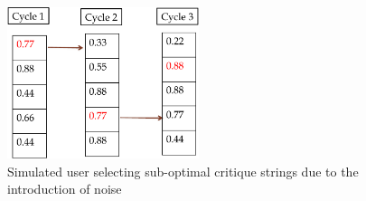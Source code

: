 \begin{figure}
  \centering
  \captionsetup{justification=centering}
    \includegraphics[width=0.5\textwidth]{figures-bharath/noisy.pdf}
  \caption{Simulated user selecting sub-optimal critique strings due to the introduction of noise}
\label{fig:noisy}
\end{figure}
